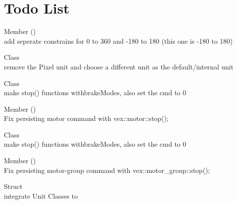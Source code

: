 \chapter{Todo List}
\hypertarget{todo}{}\label{todo}

\begin{DoxyRefList}
\item[Member \doxylink{classart_1_1_angle_ace8d0ebeae58b407fca15f951816e578}{art\+::Angle\+::constrain} ()]\hfill \\
\label{todo__todo000006}%
%
add seperate constrains for 0 to 360 and -\/180 to 180 (this one is -\/180 to 180) 
\item[Class \doxylink{classart_1_1_length}{art\+::Length} ]\hfill \\
\label{todo__todo000005}%
%
remove the Pixel unit and choose a different unit as the default/internal unit  
\item[Class \doxylink{classart_1_1_simple_motor}{art\+::Simple\+Motor} ]\hfill \\
\label{todo__todo000001}%
%
make stop() functions withbrake\+Modes, also set the cmd to 0  
\item[Member \doxylink{classart_1_1_simple_motor_aa3d8f01a6a434cdb8d6559dfe7b8d642}{art\+::Simple\+Motor\+::get} ()]\hfill \\
\label{todo__todo000002}%
%
Fix persisting motor command with vex\+::motor\+::stop(); 
\item[Class \doxylink{classart_1_1_simple_motor_group}{art\+::Simple\+Motor\+Group} ]\hfill \\
\label{todo__todo000003}%
%
make stop() functions withbrake\+Modes, also set the cmd to 0  
\item[Member \doxylink{classart_1_1_simple_motor_group_ae7e407ee8ae8e4c8456606cc1fcedf47}{art\+::Simple\+Motor\+Group\+::get} ()]\hfill \\
\label{todo__todo000004}%
%
Fix persisting motor-\/group command with vex\+::motor\+\_\+group\+::stop(); 
\item[Struct \doxylink{structart_1_1_vec2}{art\+::Vec2} ]\hfill \\
\label{todo__todo000007}%
%
integrate Unit Classes to  
\end{DoxyRefList}